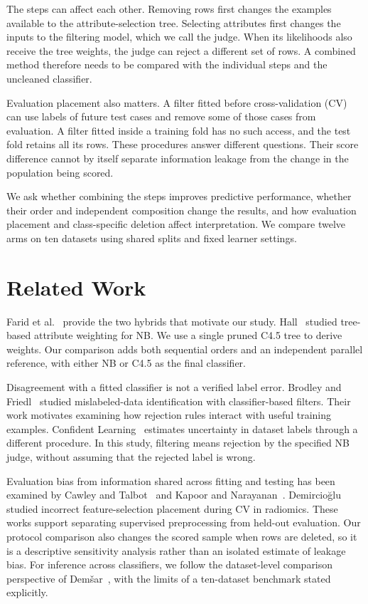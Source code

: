 \documentclass[conference,a4paper]{IEEEtran}
\begin{document}
The steps can affect each other. Removing rows first changes the examples available to the attribute-selection tree. Selecting attributes first changes the inputs to the filtering model, which we call the judge. When its likelihoods also receive the tree weights, the judge can reject a different set of rows. A combined method therefore needs to be compared with the individual steps and the uncleaned classifier.

Evaluation placement also matters. A filter fitted before cross-validation (CV) can use labels of future test cases and remove some of those cases from evaluation. A filter fitted inside a training fold has no such access, and the test fold retains all its rows. These procedures answer different questions. Their score difference cannot by itself separate information leakage from the change in the population being scored.

We ask whether combining the steps improves predictive performance, whether their order and independent composition change the results, and how evaluation placement and class-specific deletion affect interpretation. We compare twelve arms on ten datasets using shared splits and fixed learner settings.

\section{Related Work}
Farid et al.~\cite{farid2014hybrid} provide the two hybrids that motivate our study. Hall~\cite{hall2007decision} studied tree-based attribute weighting for NB. We use a single pruned C4.5 tree to derive weights. Our comparison adds both sequential orders and an independent parallel reference, with either NB or C4.5 as the final classifier.

Disagreement with a fitted classifier is not a verified label error. Brodley and Friedl~\cite{brodley1999identifying} studied mislabeled-data identification with classifier-based filters. Their work motivates examining how rejection rules interact with useful training examples. Confident Learning~\cite{northcutt2021confident} estimates uncertainty in dataset labels through a different procedure. In this study, filtering means rejection by the specified NB judge, without assuming that the rejected label is wrong.

Evaluation bias from information shared across fitting and testing has been examined by Cawley and Talbot~\cite{cawley2010overfitting} and Kapoor and Narayanan~\cite{kapoor2023leakage}. Demircio\u{g}lu~\cite{demircioglu2021measuring} studied incorrect feature-selection placement during CV in radiomics. These works support separating supervised preprocessing from held-out evaluation. Our protocol comparison also changes the scored sample when rows are deleted, so it is a descriptive sensitivity analysis rather than an isolated estimate of leakage bias. For inference across classifiers, we follow the dataset-level comparison perspective of Dem\v{s}ar~\cite{demsar2006statistical}, with the limits of a ten-dataset benchmark stated explicitly.
\end{document}
